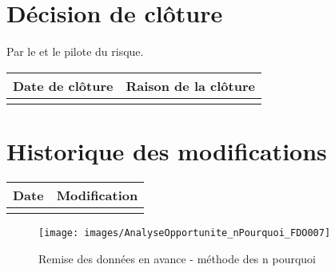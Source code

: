 \section*{Décision de clôture}
Par le \CP{} et le pilote du risque.
\begin{table}[H]
\centering
	\begin{tabularx}{16.8cm}{|X|X|}
	\hline
	\rowcolor{gray!40} Date de clôture & Raison de la clôture \\
	\hline
	  & \\
	\hline
	\end{tabularx}
\end{table}

\section*{Historique des modifications}
\begin{table}[H]
\centering
	\begin{tabularx}{16.8cm}{|X|X|}
	\hline
	\rowcolor{gray!40} Date & Modification \\
	\hline
	  & \\
	\hline
	\end{tabularx}
\end{table}
\newpage


\begin{figure}
	\centering
	\texttt{[image: images/AnalyseOpportunite\_nPourquoi\_FDO007]}
	\caption{\label{opportinute avance donnees} Remise des données en avance - méthode des n pourquoi}
\end{figure}